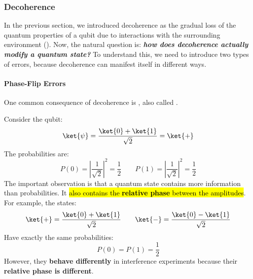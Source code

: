 \subsubsection{Decoherence}\label{sec:decoherence}

In the previous section, we introduced decoherence as the gradual loss of the quantum properties of a qubit due to interactions with the surrounding environment (). Now, the natural question is: \textbf{\emph{how does decoherence actually modify a quantum state?}} To understand this, we need to introduce two types of errors, because decoherence can manifest itself in different ways.

\longline

\paragraph{Phase-Flip Errors}\label{sec:phase-flip-errors}

One common consequence of decoherence is , also called .

\highspace
Consider the qubit:
\begin{equation*}
    \ket{\psi} = \frac{\ket{0} + \ket{1}}{\sqrt{2}} = \ket{+}
\end{equation*}
The probabilities are:
\begin{equation*}
    P(0) = \left|\frac{1}{\sqrt{2}}\right|^2 = \frac{1}{2} \qquad P(1) = \left|\frac{1}{\sqrt{2}}\right|^2 = \frac{1}{2}
\end{equation*}
The important observation is that a quantum state contains more information than probabilities. It \hl{also contains the \textbf{relative phase} between the amplitudes}. For example, the states:
\begin{equation*}
    \ket{+} = \frac{\ket{0} + \ket{1}}{\sqrt{2}} \qquad \ket{-} = \frac{\ket{0} - \ket{1}}{\sqrt{2}}
\end{equation*}
Have exactly the same probabilities:
\begin{equation*}
    P(0) = P(1) = \frac{1}{2}
\end{equation*}
However, they \textbf{behave differently} in interference experiments because their \textbf{relative phase is different}.

